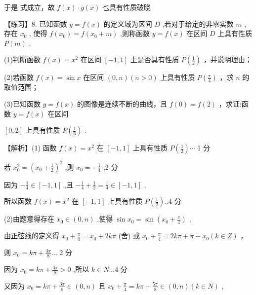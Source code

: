 \documentclass[10pt]{article}
\newcommand*\circled[1]{\tikz[baseline=(char.base)]{\node[shape=circle,draw,inner sep=1.5pt] (char) {\small #1};}}
\begin{document}
于是 \circled{1} 式成立，故 \(f\left( x\right)  \cdot  g\left( x\right)\) 也具有性质破晓

【练习】8. 已知函数 \(y = f\left( x\right)\) 的定义域为区间 \(D\) ,若对于给定的非零实数 \(m\) ,存在 \({x}_{0}\) , 使得 \(f\left( {x}_{0}\right)  = f\left( {{x}_{0} + m}\right)\) ,则称函数 \(y = f\left( x\right)\) 在区间 \(D\) 上具有性质 \(P\left( m\right)\) .

(1)判断函数 \(f\left( x\right)  = {x}^{2}\) 在区间 \(\left\lbrack  {-1,1}\right\rbrack\) 上是否具有性质 \(P\left( \frac{1}{2}\right)\) ，并说明理由；

(2)若函数 \(f\left( x\right)  = \sin x\) 在区间 \(\left( {0,n}\right) \left( {n > 0}\right)\) 上具有性质 \(P\left( \frac{\pi }{4}\right)\) ，求 \(n\) 的取值范围；

(3)已知函数 \(y = f\left( x\right)\) 的图像是连续不断的曲线，且 \(f\left( 0\right)  = f\left( 2\right)\) ，求证:函数 \(y = f\left( x\right)\) 在区间

\(\left\lbrack  {0,2}\right\rbrack\) 上具有性质 \(P\left( \frac{1}{3}\right)\) .

【解析】(1) 函数 \(f\left( x\right)  = {x}^{2}\) 在 \(\left\lbrack  {-1,1}\right\rbrack\) 上具有性质 \(P\left( \frac{1}{2}\right) \cdots\) 1 分

若 \({x}_{0}^{2} = {\left( {x}_{0} + \frac{1}{2}\right) }^{2}\) ,则 \({x}_{0} =  - \frac{1}{4}\) ,2 分

因为 \(- \frac{1}{4} \in  \left\lbrack  {-1,1}\right\rbrack\) ,且 \(- \frac{1}{4} + \frac{1}{2} = \frac{1}{4} \in  \left\lbrack  {-1,1}\right\rbrack\) ,

所以函数 \(f\left( x\right)  = {x}^{2}\) 在 \(\left\lbrack  {-1,1}\right\rbrack\) 上具有性质 \(P\left( \frac{1}{2}\right) ..4\) 分

(2)由题意得存在 \({x}_{0} \in  \left( {0,n}\right)\) ,使得 \(\sin {x}_{0} = \sin \left( {{x}_{0} + \frac{\pi }{4}}\right)\) ,

由正弦线的定义得 \({x}_{0} + \frac{\pi }{4} = {x}_{0} + {2k\pi }\) (舍) 或 \({x}_{0} + \frac{\pi }{4} = {2k\pi } + \pi  - {x}_{0}\left( {k \in  Z}\right)\) ，

则 \({x}_{0} = {k\pi } + \frac{3\pi }{8}\ldots\) 2 分

因为 \({x}_{0} = {k\pi } + \frac{3\pi }{8} > 0\) ,所以 \(k \in  N\ldots 4\) 分

又因为 \({x}_{0} = {k\pi } + \frac{3\pi }{8} \in  \left( {0,n}\right)\) 且 \({x}_{0} + \frac{\pi }{4} = {k\pi } + \frac{5\pi }{8} \in  \left( {0,n}\right) \left( {k \in  N}\right)\) ,
\end{document}
